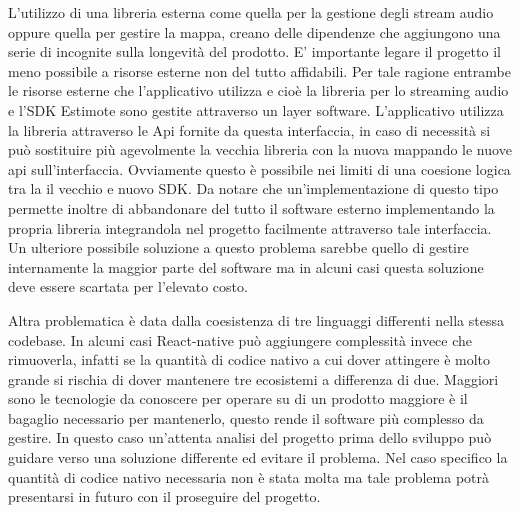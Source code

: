 L’utilizzo di una libreria esterna come quella per la gestione degli stream audio oppure quella per gestire la mappa, creano delle dipendenze che aggiungono una serie di incognite sulla longevità del prodotto. E’ importante legare il progetto il meno possibile a risorse esterne non del tutto affidabili. Per tale ragione entrambe le risorse esterne che l’applicativo utilizza e cioè la libreria per lo streaming audio e l’SDK Estimote sono gestite attraverso un layer software. L’applicativo utilizza la libreria attraverso le Api fornite da questa interfaccia, in caso di necessità si può sostituire più agevolmente la vecchia libreria con la nuova mappando le nuove api sull’interfaccia. Ovviamente questo è possibile nei limiti di una coesione logica tra la il vecchio e nuovo SDK. Da notare che un'implementazione di questo tipo permette inoltre di abbandonare del tutto il software esterno implementando la propria libreria integrandola nel progetto facilmente attraverso tale interfaccia. Un ulteriore possibile soluzione a questo problema sarebbe quello di gestire internamente la maggior parte del software ma in alcuni casi questa soluzione deve essere scartata per l’elevato costo.\vspace{5mm}

Altra problematica è data dalla coesistenza di tre linguaggi differenti nella stessa codebase. In alcuni casi React-native può aggiungere complessità invece che rimuoverla, infatti se la quantità di codice nativo a cui dover attingere è molto grande si rischia di dover mantenere tre ecosistemi a differenza di due. Maggiori sono le tecnologie da conoscere per operare su di un prodotto maggiore è il bagaglio necessario per mantenerlo, questo rende il software più complesso da gestire. In questo caso un'attenta analisi del progetto prima dello sviluppo può guidare verso una soluzione differente ed evitare il problema. Nel caso specifico la quantità di codice nativo necessaria non è stata molta ma tale problema potrà presentarsi in futuro con il proseguire del progetto.\vspace{5mm}



